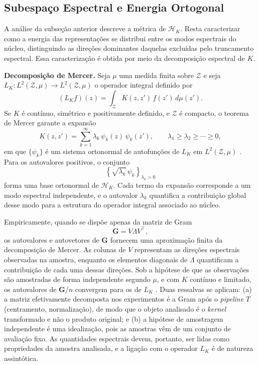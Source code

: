 \subsection{Subespaço Espectral e Energia Ortogonal}\label{subsec:spectral}
 
A análise da subseção anterior descreve a métrica de $\mathcal{H}_K$. Resta caracterizar como a energia das representações se distribui entre os modos espectrais do núcleo, distinguindo as direções dominantes daquelas excluídas pelo truncamento espectral. Essa caracterização é obtida por meio da decomposição espectral de $K$.
 
\textbf{Decomposição de Mercer.} Seja $\mu$ uma medida finita sobre $\mathcal{Z}$ e seja $L_K : L^2(\mathcal{Z},\mu) \to L^2(\mathcal{Z},\mu)$ o operador integral definido por
\begin{equation}\label{eq:integral_operator}
    (L_K f)(z)
    =
    \int_{\mathcal{Z}}
    K(z,z')\,f(z')\,d\mu(z').
\end{equation}
Se $K$ é contínuo, simétrico e positivamente definido, e $\mathcal{Z}$ é compacto, o teorema de Mercer garante a expansão
\begin{equation}\label{eq:mercer}
    K(z,z')
    =
    \sum_{k=1}^{\infty}
    \lambda_k\,\psi_k(z)\,\psi_k(z'),
    \qquad
    \lambda_1 \geq \lambda_2 \geq \cdots \geq 0,
\end{equation}
em que $\{\psi_k\}$ é um sistema ortonormal de autofunções de $L_K$ em $L^2(\mathcal{Z},\mu)$ \citep{Mercer1909, Aronszajn1950}. Para os autovalores positivos, o conjunto
\begin{equation*}
    \left\{
        \sqrt{\lambda_k}\,\psi_k
    \right\}_{\lambda_k>0}
\end{equation*}
forma uma base ortonormal de $\mathcal{H}_K$. Cada termo da expansão corresponde a um modo espectral independente, e o autovalor $\lambda_k$ quantifica a contribuição global desse modo para a estrutura do operador integral associado ao núcleo.

Empiricamente, quando se dispõe apenas da matriz de Gram
\begin{equation*}
    \mathbf{G}
    =
    V\Lambda V^\top,
\end{equation*}
os autovalores e autovetores de $\mathbf{G}$ fornecem uma aproximação finita da decomposição de Mercer. As colunas de $V$ representam as direções espectrais observadas na amostra, enquanto os elementos diagonais de $\Lambda$ quantificam a contribuição de cada uma dessas direções. Sob a hipótese de que as observações são amostradas de forma independente segundo $\mu$, e com $K$ contínuo e limitado, os autovalores de $\mathbf{G}/n$ convergem para os de $L_K$ \citep{KoltchinskiiGine2000, Rosasco2010}. Duas ressalvas se aplicam: (a) a matriz efetivamente decomposta nos experimentos é a Gram após o \textit{pipeline} $T$ (centramento, normalização), de modo que o objeto analisado é o \textit{kernel} transformado e não o produto original; e (b) a hipótese de amostragem independente é uma idealização, pois as amostras vêm de um conjunto de avaliação fixo. As quantidades espectrais devem, portanto, ser lidas como propriedades da amostra analisada, e a ligação com o operador $L_K$ é de natureza assintótica.
 
